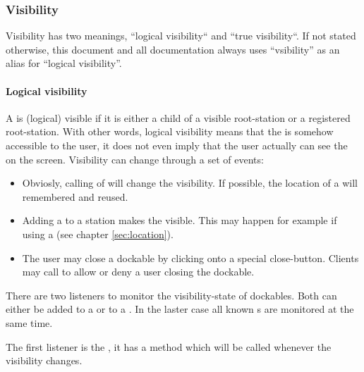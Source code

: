 
\subsubsection{Visibility}
Visibility has two meanings, ``logical visibility`` and ``true visibility``. If not stated otherwise, this document and all documentation always uses ``vsibility'' as an alias for ``logical visibility''.

\paragraph{Logical visibility}
A  is (logical) visible if it is either a child of a visible root-station or a registered root-station. With other words, logical visibility means that the  is somehow accessible to the user, it does not even imply that the user actually can see the  on the screen. Visibility can change through a set of events:
\begin{itemize}
 \item Obviosly, calling  of  will change the visibility. If possible, the location of a  will remembered and reused.
 \item Adding a  to a station makes the  visible. This may happen for example if using a  (see chapter \ref{sec:location}).
 \item The user may close a dockable by clicking onto a special close-button. Clients may call  to allow or deny a user closing the dockable.
\end{itemize}

There are two listeners to monitor the visibility-state of dockables. Both can either be added to a  or to a . In the laster case all known s are monitored at the same time.

The first listener is the , it has a method \linebreak {} which will be called whenever the visibility changes.

